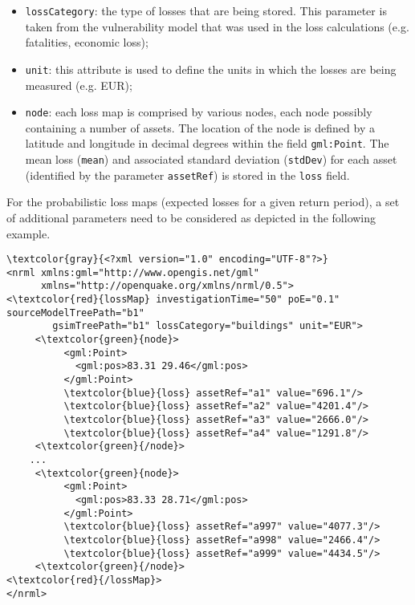 \begin{itemize}
\item  \Verb+lossCategory+: the type of losses that are being stored. This parameter is taken from the \gls{vulnerability model} that was used in the loss calculations (e.g. fatalities, economic loss);
\item  \Verb+unit+: this attribute is used to define the units in which the losses are being measured (e.g. EUR);
\item  \Verb+node+: each loss map is comprised by various nodes, each node possibly containing a number of \glspl{asset}. The location of the node is defined by a latitude and longitude in decimal degrees within the field \Verb+gml:Point+. The mean loss (\Verb+mean+) and associated standard deviation (\Verb+stdDev+) for each \gls{asset} (identified by the parameter \Verb+assetRef+) is stored in the \Verb+loss+ field.
\end{itemize}

For the probabilistic loss maps (expected losses for a given return period), a
set of additional parameters need to be considered as depicted in the
following example.

\begin{Verbatim}[frame=single, commandchars=\\\{\}, samepage=false]
\textcolor{gray}{<?xml version="1.0" encoding="UTF-8"?>}
<nrml xmlns:gml="http://www.opengis.net/gml"
      xmlns="http://openquake.org/xmlns/nrml/0.5">
<\textcolor{red}{lossMap} investigationTime="50" poE="0.1" sourceModelTreePath="b1"
        gsimTreePath="b1" lossCategory="buildings" unit="EUR">
     <\textcolor{green}{node}>
          <gml:Point>
            <gml:pos>83.31 29.46</gml:pos>
          </gml:Point>
          \textcolor{blue}{loss} assetRef="a1" value="696.1"/>
          \textcolor{blue}{loss} assetRef="a2" value="4201.4"/>
          \textcolor{blue}{loss} assetRef="a3" value="2666.0"/>
          \textcolor{blue}{loss} assetRef="a4" value="1291.8"/>
     <\textcolor{green}{/node}>
    ...
     <\textcolor{green}{node}>
          <gml:Point>
            <gml:pos>83.33 28.71</gml:pos>
          </gml:Point>
          \textcolor{blue}{loss} assetRef="a997" value="4077.3"/>
          \textcolor{blue}{loss} assetRef="a998" value="2466.4"/>
          \textcolor{blue}{loss} assetRef="a999" value="4434.5"/>
     <\textcolor{green}{/node}>
<\textcolor{red}{/lossMap}>
</nrml>
\end{Verbatim}

